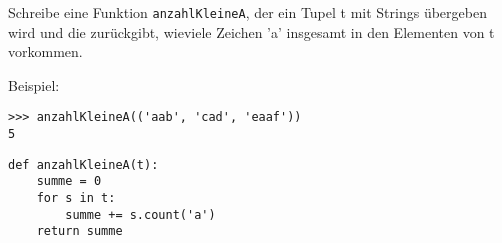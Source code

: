 \question[3]
Schreibe eine Funktion
\texttt{anzahlKleineA}, der ein Tupel t mit Strings übergeben wird und 
die zurückgibt, wieviele Zeichen 'a' insgesamt in den Elementen von t vorkommen.


Beispiel:
\begin{lstlisting}
>>> anzahlKleineA(('aab', 'cad', 'eaaf'))
5
\end{lstlisting}
\begin{solutionbox}{4cm}
\begin{lstlisting}
def anzahlKleineA(t):
    summe = 0
    for s in t:
        summe += s.count('a')
    return summe
\end{lstlisting}
\end{solutionbox}
